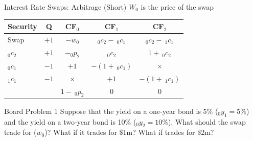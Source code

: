 \documentclass{beamer}
\begin{document}
\begin{frame}{Interest Rate Swaps: Arbitrage (Short)}
    $W_{0}$ is the price of the swap
    \begin{center}
        \begin{tabular}{lcccc}
            Security & Q & CF$_{0}$ & CF$_{1}$ & CF$_{2}$\\ \hline
            Swap & $+1$ & $-w_{0}$ & $_{0}c_{2}-\:_{0}c_{1}$ & $_{0}c_{2}-\:_{1}c_{1}$ \\
            $_{0}c_{2}$ & $+1$ & $-_{0}p_{2}$ & $_{0}c_{2}$ & $1+\:_{0}c_{2}$ \\
            $_{0}c_{1}$ & $-1$ & $+1$ & $-(1+\:_{0}c_{1})$ & $\times$ \\
            $_{1}c_{1}$ & $-1$ & $\times$ & $+1$ & $-(1+\:_{1}c_{1})$ \\ \hline 
            & & $1-\:_{0}p_{2}$ & $0$ & $0$
        \end{tabular}
    \end{center}
\end{frame}

\begin{frame}{Board Problem 1}
    Suppose that the yield on a one-year bond is 5\% ($_{0}y_{1}=5\%$) and the yield on a two-year bond is 10\% ($_{0}y_{2}=10\%$). What should the swap trade for ($w_{0}$)? What if it trades for \$1m? What if trades for \$2m? 
\end{frame}

\fi
\end{document}
